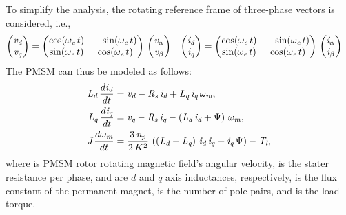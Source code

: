 To simplify the analysis, the rotating reference frame of three-phase vectors is considered, i.e.,
\begin{align*}
	\begin{pmatrix}
			\vd \\
			\vq
	\end{pmatrix} &= \begin{pmatrix}
						\cos(\we\,t) & -\sin(\we\,t) \\
						\sin(\we\,t) & \cos(\we\,t) \\
					 \end{pmatrix}\, \begin{pmatrix}
										 \valpha \\
										 \vbeta
									 \end{pmatrix} & \begin{pmatrix}
									 \id \\
									 \iq
								 \end{pmatrix} &= \begin{pmatrix}
								 \cos(\we\,t) & -\sin(\we\,t) \\
								 \sin(\we\,t) & \cos(\we\,t) \\
							 \end{pmatrix}\, \begin{pmatrix}
							 \ialpha \\
							 \ibeta
						 \end{pmatrix}
\end{align*}
The PMSM can thus be modeled as follows:
\begin{align*}
	\Ld\,\frac{d\id}{dt} &= \vd - \Rs\,\id + \Lq\,\iq\,\wm,\\
	\Lq\,\frac{d\iq}{dt} &= \vq - \Rs\,\iq - \left(\Ld\,\id + \flux\right)\,\wm,\\
	\J\,\frac{d\wm}{dt} &= \frac{3\,\np}{2\,K^2}\,\left(\left(\Ld - \Lq\right)\,\id\,\iq + \iq\,\flux\right) - \Tl,
\end{align*}
where \wm is PMSM rotor rotating magnetic field's angular velocity, \Rs is the stater resistance per phase, \Ld and \Lq are $d$ and $q$ axis inductances, respectively, \flux is the flux constant of the permanent magnet, \np is the number of pole pairs, and \Tl is the load torque. 


